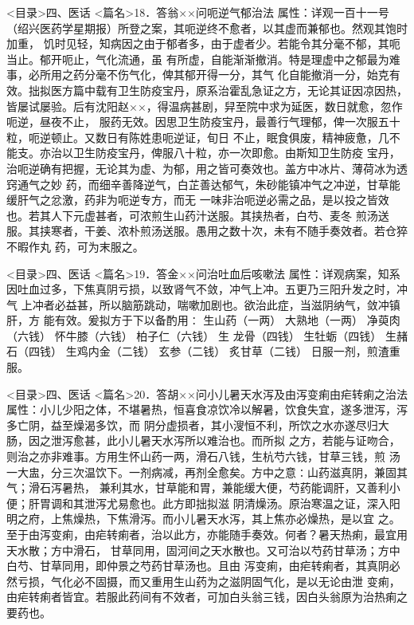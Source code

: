 \documentclass[a4paper,12pt,UTF8,twoside]{ctexbook}
\begin{document}
<目录>四、医话
<篇名>18．答翁××问呃逆气郁治法
属性：详观一百十一号（绍兴医药学星期报）所登之案，其呃逆终不愈者，以其虚而兼郁也。然观其饱时加重， 
饥时见轻，知病因之由于郁者多，由于虚者少。若能令其分毫不郁，其呃当止。郁开呃止，气化流通，虽 
有所虚，自能渐渐撤消。特是理虚中之郁最为难事，必所用之药分毫不伤气化，俾其郁开得一分，其气 
化自能撤消一分，始克有效。拙拟医方篇中载有卫生防疫宝丹，原系治霍乱急证之方，无论其证因凉因热， 
皆屡试屡验。后有沈阳赵××，得温病甚剧，舁至院中求为延医，数日就愈，忽作呃逆，昼夜不止， 
服药无效。因思卫生防疫宝丹，最善行气理郁，俾一次服五十粒，呃逆顿止。又数日有陈姓患呃逆证，旬日 
不止，眠食俱废，精神疲惫，几不能支。亦治以卫生防疫宝丹，俾服八十粒，亦一次即愈。由斯知卫生防疫 
宝丹，治呃逆确有把握，无论其为虚、为郁，用之皆可奏效也。盖方中冰片、薄荷冰为透窍通气之妙 
药，而细辛善降逆气，白芷善达郁气，朱砂能镇冲气之冲逆，甘草能缓肝气之忿激，药非为呃逆专方，而无 
一味非治呃逆必需之品，是以投之皆效也。若其人下元虚甚者，可浓煎生山药汁送服。其挟热者，白芍、麦冬 
煎汤送服。其挟寒者，干姜、浓朴煎汤送服。愚用之数十次，未有不随手奏效者。若仓猝不暇作丸 
药，可为末服之。 

<目录>四、医话
<篇名>19．答金××问治吐血后咳嗽法
属性：详观病案，知系因吐血过多，下焦真阴亏损，以致肾气不敛，冲气上冲。五更乃三阳升发之时，冲气 
上冲者必益甚，所以脑筋跳动，喘嗽加剧也。欲治此症，当滋阴纳气，敛冲镇肝，方 
能有效。爰拟方于下以备酌用∶ 
生山药（一两） 大熟地（一两） 净萸肉（六钱） 怀牛膝（六钱） 柏子仁（六钱） 生 
龙骨（四钱） 生牡蛎（四钱） 生赭石（四钱） 生鸡内金（二钱） 玄参（二钱） 炙甘草（二钱） 
日服一剂，煎渣重服。 

<目录>四、医话
<篇名>20．答胡××问小儿暑天水泻及由泻变痢由疟转痢之治法
属性：小儿少阳之体，不堪暑热，恒喜食凉饮冷以解暑，饮食失宜，遂多泄泻，泻多亡阴，益至燥渴多饮，而 
阴分虚损者，其小溲恒不利，所饮之水亦遂尽归大肠，因之泄泻愈甚，此小儿暑天水泻所以难治也。而所拟 
之方，若能与证吻合，则治之亦非难事。方用生怀山药一两，滑石八钱，生杭芍六钱，甘草三钱，煎 
汤一大盅，分三次温饮下。一剂病减，再剂全愈矣。方中之意∶山药滋真阴，兼固其气；滑石泻暑热， 
兼利其水，甘草能和胃，兼能缓大便，芍药能调肝，又善利小便；肝胃调和其泄泻尤易愈也。此方即拙拟滋 
阴清燥汤。原治寒温之证，深入阳明之府，上焦燥热，下焦滑泻。而小儿暑天水泻，其上焦亦必燥热，是以宜 
之。至于由泻变痢，由疟转痢者，治以此方，亦能随手奏效。何者？暑天热痢，最宜用天水散；方中滑石， 
甘草同用，固河间之天水散也。又可治以芍药甘草汤；方中白芍、甘草同用，即仲景之芍药甘草汤也。且由 
泻变痢，由疟转痢者，其真阴必然亏损，气化必不固摄，而又重用生山药为之滋阴固气化，是以无论由泄 
变痢，由疟转痢者皆宜。若服此药间有不效者，可加白头翁三钱，因白头翁原为治热痢之要药也。 
\end{document}
